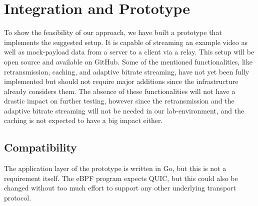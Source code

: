 \section{Integration and Prototype}\label{sec:integration_and_prototype}

To show the feasibility of our approach, we have built a prototype 
that implements the suggested setup.
It is capable of streaming an example video as well as mock-payload data from 
a server to a client via a relay.
This setup will be open source and available on GitHub.
Some of the mentioned functionalities, like retransmission, caching, and adaptive
bitrate streaming, have not yet been fully implemented but should not require major
additions since the infrastructure already considers them.
The absence of these functionalities will not have a drastic impact on further 
testing, however since the retransmission and the adaptive bitrate streaming will not
be needed in our lab-environment, and the caching is not expected to have a big impact
either.

\subsection{Compatibility}
The application layer of the prototype is written in Go, but this is not a requirement
itself.
The eBPF program expects QUIC, but this could also be changed without too much effort to
support any other underlying transport protocol.

